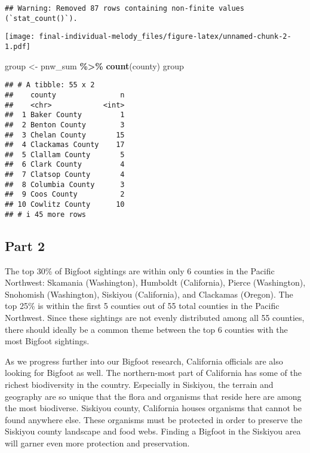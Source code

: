 \documentclass[
]{article}
\newenvironment{Shaded}{\begin{snugshade}}{\end{snugshade}}
\newcommand{\FunctionTok}[1]{\textcolor[rgb]{0.13,0.29,0.53}{\textbf{#1}}}
\newcommand{\NormalTok}[1]{#1}
\newcommand{\OtherTok}[1]{\textcolor[rgb]{0.56,0.35,0.01}{#1}}
\newcommand{\SpecialCharTok}[1]{\textcolor[rgb]{0.81,0.36,0.00}{\textbf{#1}}}
\begin{document}
\begin{verbatim}
## Warning: Removed 87 rows containing non-finite values (`stat_count()`).
\end{verbatim}

\texttt{[image: final-individual-melody\_files/figure-latex/unnamed-chunk-2-1.pdf]}

\begin{Shaded}
\begin{Highlighting}[]
\NormalTok{group }\OtherTok{\textless{}{-}}\NormalTok{ pnw\_sum }\SpecialCharTok{\%\textgreater{}\%} \FunctionTok{count}\NormalTok{(county)}
\NormalTok{group}
\end{Highlighting}
\end{Shaded}

\begin{verbatim}
## # A tibble: 55 x 2
##    county               n
##    <chr>            <int>
##  1 Baker County         1
##  2 Benton County        3
##  3 Chelan County       15
##  4 Clackamas County    17
##  5 Clallam County       5
##  6 Clark County         4
##  7 Clatsop County       4
##  8 Columbia County      3
##  9 Coos County          2
## 10 Cowlitz County      10
## # i 45 more rows
\end{verbatim}

\hypertarget{part-2}{%
\subsection{Part 2}\label{part-2}}

The top 30\% of Bigfoot sightings are within only 6 counties in the
Pacific Northwest: Skamania (Washington), Humboldt (California), Pierce
(Washington), Snohomish (Washington), Siskiyou (California), and
Clackamas (Oregon). The top 25\% is within the first 5 counties out of
55 total counties in the Pacific Northwest. Since these sightings are
not evenly distributed among all 55 counties, there should ideally be a
common theme between the top 6 counties with the most Bigfoot sightings.

As we progress further into our Bigfoot research, California officials
are also looking for Bigfoot as well. The northern-most part of
California has some of the richest biodiversity in the country.
Especially in Siskiyou, the terrain and geography are so unique that the
flora and organisms that reside here are among the most biodiverse.
Siskiyou county, California houses organisms that cannot be found
anywhere else. These organisms must be protected in order to preserve
the Siskiyou county landscape and food webs. Finding a Bigfoot in the
Siskiyou area will garner even more protection and preservation.
\end{document}
